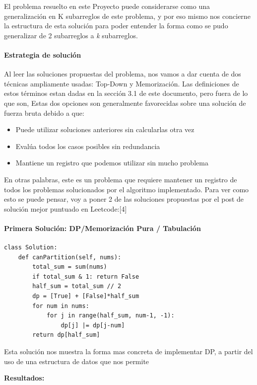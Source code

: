 \documentclass[a4paper]{article}
\begin{document}
El problema resuelto en este Proyecto puede considerarse como una generalización en
K subarreglos de este problema, y por eso mismo nos concierne la estructura de esta 
solución para poder entender la forma como se pudo generalizar de 2 subarreglos a \textit{k}
subarreglos.

\paragraph{Estrategia de solución}
Al leer las soluciones propuestas del problema, nos vamos a dar cuenta de dos 
técnicas ampliamente usadas: Top-Down y Memorización. Las definiciones de estos 
términos estan dadas en la sección 3.1 de este documento, pero fuera de lo que son,
Estas dos opciones son generalmente favorecidas sobre una solución de fuerza bruta debido a que:

\begin{itemize}
    \item Puede utilizar soluciones anteriores sin calcularlas otra vez
    \item Evalúa todos los casos posibles sin redundancia
    \item Mantiene un registro que podemos utilizar sin mucho problema
\end{itemize}

En otras palabras, este es un problema que requiere mantener un registro de todos los problemas
solucionados por el algoritmo implementado. Para ver como esto se puede pensar, voy a 
poner 2 de las soluciones propuestas por el post de solución mejor puntuado en Leetcode:[4]

\paragraph{Primera Solución: DP/Memorización Pura / Tabulación}

\begin{verbatim}
class Solution:
    def canPartition(self, nums):
        total_sum = sum(nums)
        if total_sum & 1: return False
        half_sum = total_sum // 2
        dp = [True] + [False]*half_sum
        for num in nums:
            for j in range(half_sum, num-1, -1):
                dp[j] |= dp[j-num]
        return dp[half_sum]
\end{verbatim}

Esta solución nos muestra la forma mas concreta de implementar DP, 
a partir del uso de una estructura de datos que nos permite 

\textbf{Resultados:}
\end{document}

